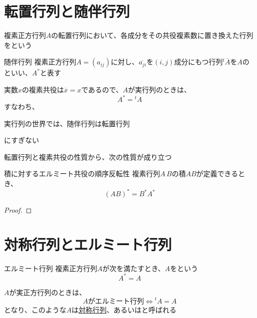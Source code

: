\documentclass[../../../topic_linear-algebra]{subfiles}
\begin{document}
\sectionline
\section{転置行列と随伴行列}

複素正方行列$A$の転置行列において、各成分をその共役複素数に置き換えた行列をという

\begin{definition}{随伴行列}
  複素正方行列$A = (a_{ij})$に対し、$\overline{a_{ji}}$を$(i,j)$成分にもつ行列${}^t\overline{A}$を$A$のといい、$A^*$と表す
\end{definition}

実数$x$の複素共役は$\overline{x} = x$であるので、$A$が実行列のときは、
\begin{equation*}
  A^* = {}^t A
\end{equation*}
すなわち、
\begin{shaded}
  実行列の世界では、随伴行列は転置行列
\end{shaded}
にすぎない

\sectionline

転置行列と複素共役の性質から、次の性質が成り立つ

\begin{theorem}{積に対するエルミート共役の順序反転性}
  複素行列$A\,B$の積$AB$が定義できるとき、
  \begin{equation*}
    (AB)^* = B^* A^*
  \end{equation*}
\end{theorem}

\begin{proof}
  \todo{}
\end{proof}

\sectionline
\section{対称行列とエルミート行列}

\begin{definition}{エルミート行列}
  複素正方行列$A$が次を満たすとき、$A$をという
  \begin{equation*}
    A^* = A
  \end{equation*}
\end{definition}

$A$が実正方行列のときは、
\begin{equation*}
  A\text{がエルミート行列} \Longleftrightarrow {}^tA = A
\end{equation*}
となり、このような$A$は\hyperref[def:symmetric-matrix]{対称行列}、あるいはと呼ばれる
\end{document}
